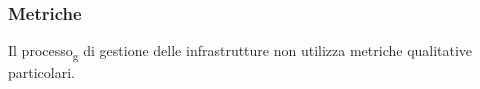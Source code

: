 \subsubsection{Metriche}
Il processo\textsubscript{g} di gestione delle infrastrutture non utilizza metriche qualitative particolari.